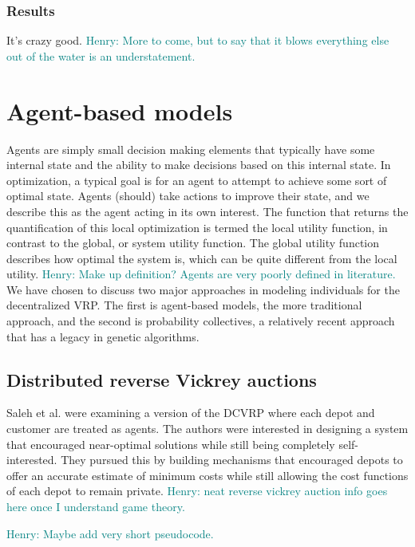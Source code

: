 \documentclass{sig-alternate}
\newcommand{\allcomments}[1]{{#1}}
\newcommand{\hfcomment}[1]{\textcolor{Teal}{\allcomments{Henry: {#1}}}}
\begin{document}
{\subsubsection{Results} 
 It's crazy good. \hfcomment{More to come, but to say that it blows everything else out of the water is an understatement.}
\section{Agent-based models}
Agents are simply small decision making elements that typically have some internal state and the ability to make decisions based on this internal state. In optimization, a typical goal is for an agent to attempt to achieve some sort of optimal state. Agents (should) take actions to improve their state, and we describe this as the agent acting in its own interest. The function that returns the quantification of this local optimization is termed the local utility function, in contrast to the global, or system utility function. The global utility function describes how optimal the system is, which can be quite different from the local utility. 
\hfcomment{Make up definition? Agents are very poorly defined in literature.}
We have chosen to discuss two major approaches in modeling individuals for the decentralized VRP. The first is agent-based models, the more traditional approach, and the second is probability collectives, a relatively recent approach that has a legacy in genetic algorithms.

\subsection{Distributed reverse Vickrey auctions}

Saleh et al.\cite{Saleh:2012} were examining a version of the DCVRP where each depot and customer are treated as agents. The authors were interested in designing a system that encouraged near-optimal solutions while still being completely self-interested. They pursued this by building mechanisms that encouraged depots to offer an accurate estimate of minimum costs while still allowing the cost functions of each depot to remain private. \hfcomment{neat reverse vickrey auction info goes here once I understand game theory.}

\hfcomment{Maybe add very short pseudocode.}

}
\end{document}
